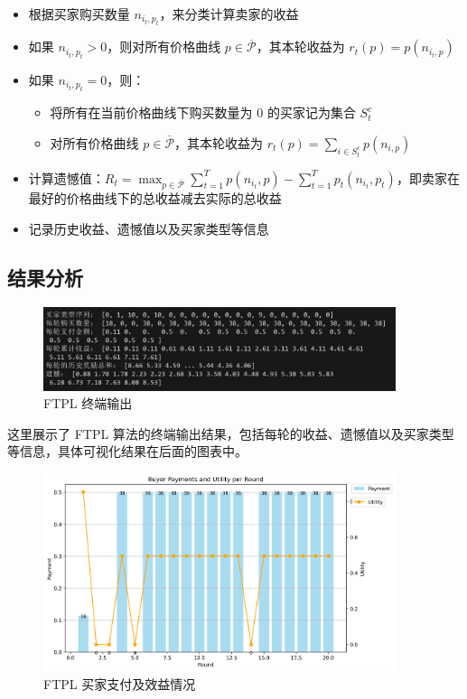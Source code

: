 \begin{itemize}
    \item 根据买家购买数量 $n_{i_t,p_t}$，来分类计算卖家的收益
    \item 如果 $n_{i_t,p_t} > 0$，则对所有价格曲线 $p\in \overline{\mathcal{P}}$，其本轮收益为 $r_t(p) = p(n_{i_t,p})$
    \item 如果 $n_{i_t,p_t} = 0$，则：
    \begin{itemize}
        \item 将所有在当前价格曲线下购买数量为 0 的买家记为集合 $S_t^c$
        \item 对所有价格曲线 $p\in \overline{\mathcal{P}}$，其本轮收益为 $r_t(p) = \sum_{i \in S_t^c} p(n_{i,p})$
    \end{itemize}
    \item 计算遗憾值：$R_t = \max_{p \in \overline{\mathcal{P}}} \sum_{t=1}^T p(n_{i_t},p) - \sum_{t=1}^T p_t(n_{i_t},p_t)$，即卖家在最好的价格曲线下的总收益减去实际的总收益
    \item 记录历史收益、遗憾值以及买家类型等信息
\end{itemize}

\subsection{结果分析}

\begin{figure}[H]
    \centering
    \includegraphics[width=0.92\textwidth]{figures/FTPL_1}
    \caption{FTPL 终端输出}
\end{figure}

这里展示了 FTPL 算法的终端输出结果，包括每轮的收益、遗憾值以及买家类型等信息，具体可视化结果在后面的图表中。

\begin{figure}[H]
    \centering
    \includegraphics[width=0.92\textwidth]{figures/FTPL_buyer_payments}
    \caption{FTPL 买家支付及效益情况}
\end{figure}

